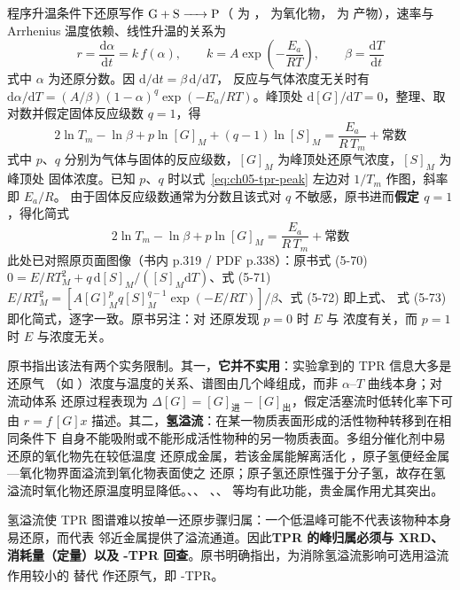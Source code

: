 程序升温条件下还原写作 $\ce{G + S -> P}$（ 为 ， 为氧化物， 为
产物），速率与 Arrhenius 温度依赖、线性升温的关系为
\begin{equation}
r = \frac{\mathrm{d}\alpha}{\mathrm{d}t} = k\,f(\alpha),\qquad
k = A\exp\!\left(-\frac{E_a}{RT}\right),\qquad
\beta = \frac{\mathrm{d}T}{\mathrm{d}t}
\label{eq:ch05-tpr}
\end{equation}
式中 $\alpha$ 为还原分数。因 $\mathrm{d}/\mathrm{d}t = \beta\,\mathrm{d}/\mathrm{d}T$，
反应与气体浓度无关时有
$\mathrm{d}\alpha/\mathrm{d}T = (A/\beta)(1-\alpha)^{q}\exp(-E_a/RT)$。峰顶处
$\mathrm{d}[G]/\mathrm{d}T = 0$，整理、取对数并假定固体反应级数 $q=1$，得
\begin{equation}
2\ln T_m - \ln\beta + p\ln[G]_M + (q-1)\ln[S]_M = \frac{E_a}{R\,T_m} + \text{常数}
\label{eq:ch05-tpr-peak}
\end{equation}
式中 $p$、$q$ 分别为气体与固体的反应级数，$[G]_M$ 为峰顶处还原气浓度，$[S]_M$ 为峰顶处
固体浓度。已知 $p$、$q$ 时以式~\eqref{eq:ch05-tpr-peak} 左边对 $1/T_m$ 作图，斜率即 $E_a/R$。
由于固体反应级数通常为分数且该式对 $q$ 不敏感，原书进而\textbf{假定 $q=1$}，得化简式
\begin{equation}
2\ln T_m - \ln\beta + p\ln[G]_M = \frac{E_a}{R\,T_m} + \text{常数}
\label{eq:ch05-tpr-peak-q1}
\end{equation}
此处已对照原页面图像（书内 p.319 / PDF p.338）：原书式 (5-70)
$0=E/RT_M^2+q\,\mathrm{d}[S]_M/([S]_M\mathrm{d}T)$、式 (5-71)
$E/RT_M^2=[A[G]_M^p q[S]_M^{q-1}\exp(-E/RT)]/\beta$、式 (5-72) 即上式、
式 (5-73) 即化简式，逐字一致。原书另注：对  还原发现 $p=0$ 时 $E$ 与
 浓度有关，而 $p=1$ 时 $E$ 与浓度无关。

原书指出该法有两个实务限制。其一，\textbf{它并不实用}：实验拿到的 TPR 信息大多是还原气
（如 ）浓度与温度的关系、谱图由几个峰组成，而非 $\alpha$–$T$ 曲线本身；对流动体系
还原过程表现为 $\Delta[G] = [G]_{\text{进}} - [G]_{\text{出}}$，假定活塞流时低转化率下可由
$r = f\,[G]x$ 描述。其二，\textbf{氢溢流}：在某一物质表面形成的活性物种转移到在相同条件下
自身不能吸附或不能形成活性物种的另一物质表面。多组分催化剂中易还原的氧化物先在较低温度
还原成金属，若该金属能解离活化 ，原子氢便经金属—氧化物界面溢流到氧化物表面使之
还原；原子氢还原性强于分子氢，故存在氢溢流时氧化物还原温度明显降低。、、
、、 等均有此功能，贵金属作用尤其突出。

\begin{crosscheck}
氢溢流使 TPR 图谱难以按单一还原步骤归属：一个低温峰可能不代表该物种本身易还原，而代表
邻近金属提供了溢流通道。因此\textbf{TPR 的峰归属必须与 XRD、 消耗量（定量）以及
-TPR 回查}。原书明确指出，为消除氢溢流影响可选用溢流作用较小的  替代
 作还原气，即 -TPR\textsuperscript{}。
\end{crosscheck}

